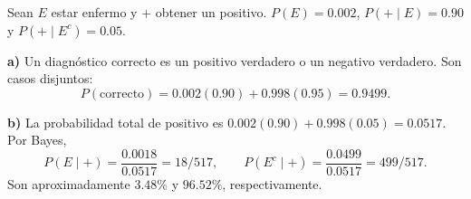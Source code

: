 Sean $E$ estar enfermo y $+$ obtener un positivo.
$P(E)=0.002$, $P(+\mid E)=0.90$ y $P(+\mid E^c)=0.05$.

\textbf{a)} Un diagnóstico correcto es un positivo verdadero
o un negativo verdadero. Son casos disjuntos:
\[
P(\text{correcto})=0.002(0.90)+0.998(0.95)=\boxed{0.9499}.
\]

\textbf{b)} La probabilidad total de positivo es
$0.002(0.90)+0.998(0.05)=0.0517$. Por Bayes,
\[
P(E\mid +)=\frac{0.0018}{0.0517}=\boxed{18/517},\qquad
P(E^c\mid +)=\frac{0.0499}{0.0517}=\boxed{499/517}.
\]
Son aproximadamente $3.48\%$ y $96.52\%$, respectivamente.
